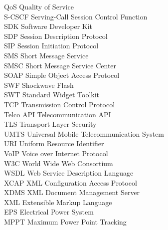\begin{tabbing}
QoS	 \> 	Quality of Service	 \\
S-CSCF	 \> 	Serving-Call Session Control Function	 \\
SDK	\>	Software Developer Kit \\
SDP	\>	Session Description Protocol \\
SIP	 \> 	Session Initiation Protocol	 \\
SMS	\>	Short Message Service \\
SMSC	\> Short Message Service Center \\
SOAP	 \> 	Simple Object Access Protocol	 \\
SWF	\>	Shockwave Flash \\
SWT	\>	Standard Widget Toolkit \\
TCP	 \> 	Transmission Control Protocol	 \\
Telco API	\>	Telecommunication API \\
TLS	\>	Transport Layer Security \\
UMTS	 \> 	Universal Mobile Telecommunication System	 \\
URI	 \> 	Uniform Resource Identifier	 \\
VoIP	 \> 	Voice over Internet Protocol	 \\
W3C	 \> 	World Wide Web Consortium	 \\
WSDL	\>	Web Service Description Language \\
XCAP	 \> 	XML Configuration Access Protocol	 \\
XDMS	 \> 	XML Document Management Server	 \\
XML	 \> 	Extensible Markup Language	 \\
EPS \>      Electrical Power System\\
MPPT \>    Maximum Power Point Tracking\\
\end{tabbing}
\endinput
